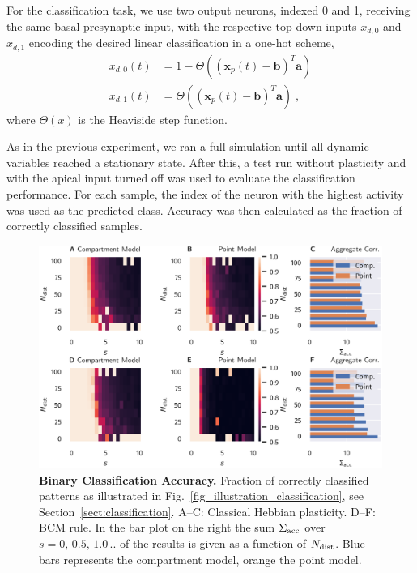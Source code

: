 \documentclass[utf8]{frontiersSCNS} %
\begin{document}
For the classification task, we use two output 
neurons, indexed 0 and 1,  receiving the same 
basal presynaptic input, with the respective 
top-down inputs $x_{d,0}$ and $x_{d,1}$ encoding 
the desired linear classification in a one-hot 
scheme, 
\begin{align}
x_{d,0}(t) &= 1 - \Theta\left( \left(\mathbf{x}_p(t) - 
\mathbf{b}\right)^T \mathbf{a}\right) \\
x_{d,1}(t) &= \Theta\left( \left(\mathbf{x}_p(t) - 
\mathbf{b}\right)^T \mathbf{a}\right) \; ,
\end{align}
where $\Theta(x)$ is the Heaviside step function.

As in the previous experiment, we ran a full simulation until 
all dynamic variables reached a stationary state. After this,
a test run without plasticity and with the apical input turned off 
was used to evaluate the classification	performance. 
For each sample, the index of the neuron with the highest 
activity was used as the predicted class. 
Accuracy was then calculated as the fraction
of correctly classified samples.
\begin{figure}[t]
\centering
\includegraphics[width=1.0\columnwidth]{classification_dimension_scaling_high_input_dim_composite}
\caption{{\bf Binary Classification Accuracy.}
Fraction of correctly classified patterns as illustrated in
Fig.~\ref{fig_illustration_classification}, see 
Section~\ref{sect:classification}. 
A--C: Classical Hebbian plasticity. 
D--F: BCM rule.
In the bar plot on the right the sum 
$\Sigma_{\rm acc}$ over $s=0,\,0.5,\,1.0\,..$ 
of the results is given as a function
of $N_{\rm dist}$. Blue bars 
represents the compartment model,
orange the point model.}
\label{fig:classification_accuracy}
\end{figure}
\end{document}

